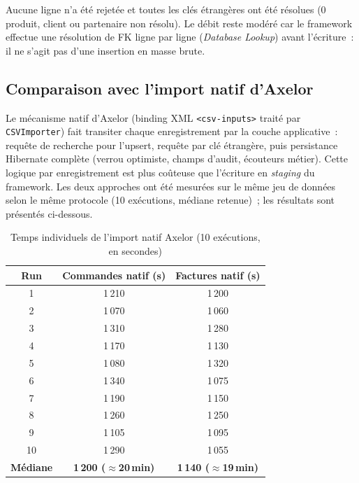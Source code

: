 Aucune ligne n'a été rejetée et toutes les clés étrangères ont été résolues (0 produit, client ou partenaire non résolu). Le débit reste modéré car le framework effectue une résolution de FK ligne par ligne (\emph{Database Lookup}) avant l'écriture~: il ne s'agit pas d'une insertion en masse brute.

\subsection{Comparaison avec l'import natif d'Axelor}

Le mécanisme natif d'Axelor (binding XML \texttt{<csv-inputs>} traité par \texttt{CSVImporter}) fait transiter chaque enregistrement par la couche applicative~: requête de recherche pour l'upsert, requête par clé étrangère, puis persistance Hibernate complète (verrou optimiste, champs d'audit, écouteurs métier). Cette logique par enregistrement est plus coûteuse que l'écriture en \emph{staging} du framework. Les deux approches ont été mesurées sur le même jeu de données selon le même protocole (10 exécutions, médiane retenue)~; les résultats sont présentés ci-dessous.

\begin{table}[H]
  \centering
  \renewcommand{\arraystretch}{1.3}
  \begin{tabular}{c c c}
    \toprule
    \rowcolor{gray!20}
    \textbf{Run} & \textbf{Commandes natif (s)} & \textbf{Factures natif (s)} \\
    \midrule
    \rowcolor{gray!5}
    1  & 1\,210 & 1\,200 \\
    2  & 1\,070 & 1\,060 \\
    \rowcolor{gray!5}
    3  & 1\,310 & 1\,280 \\
    4  & 1\,170 & 1\,130 \\
    \rowcolor{gray!5}
    5  & 1\,080 & 1\,320 \\
    6  & 1\,340 & 1\,075 \\
    \rowcolor{gray!5}
    7  & 1\,190 & 1\,150 \\
    8  & 1\,260 & 1\,250 \\
    \rowcolor{gray!5}
    9  & 1\,105 & 1\,095 \\
    10 & 1\,290 & 1\,055 \\
    \midrule
    \rowcolor{gray!10}
    \textbf{Médiane} & \textbf{1\,200 ($\approx$20\,min)} & \textbf{1\,140 ($\approx$19\,min)} \\
    \bottomrule
  \end{tabular}
  \caption{Temps individuels de l'import natif Axelor (10 exécutions, en secondes)}
  \label{tab:perf-natif-runs}
\end{table}

